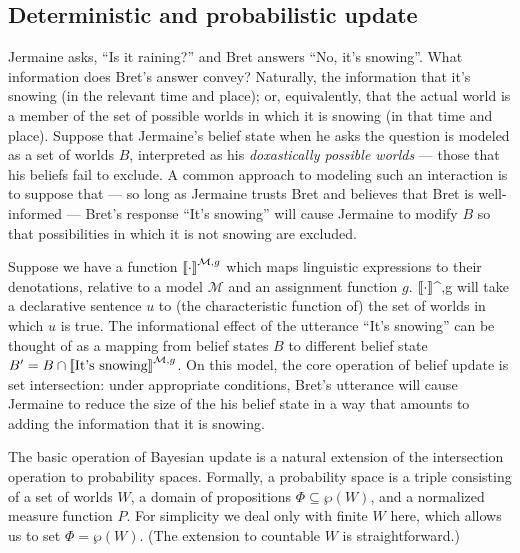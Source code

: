 \documentclass[12pt]{article}
\newcommand{\llbracket}{\ensuremath{\left [\!\left [}}%
\newcommand{\rrbracket}{\ensuremath{\right ]\!\right ]}}
\providecommand{\sv}[1]{\ensuremath{\llbracket #1 \rrbracket}}
\begin{document}
\subsection{Deterministic and probabilistic update}
Jermaine asks, ``Is it raining?'' and Bret answers ``No, it's snowing''. What information does Bret's answer convey? Naturally, the information that it's snowing (in the relevant time and place); or, equivalently, that the actual world is a member of the set of possible worlds in which it is snowing (in that time and place). Suppose that Jermaine's belief state when he asks the question is modeled as a set of worlds $B$, interpreted as his \emph{doxastically possible worlds} --- those that his beliefs fail to exclude. A common approach to modeling such an interaction is to suppose that --- so long as Jermaine trusts Bret and believes that Bret is well-informed --- Bret's response ``It's snowing'' will cause Jermaine to modify $B$ so that possibilities in which it is not snowing are excluded. 

Suppose we have a function $\sv{\cdot}^{\mathcal{M},g}$ which maps linguistic expressions to their denotations, relative to a model $\mathcal{M}$ and an assignment function $g$. \sv{\cdot}^{,g} will take a declarative sentence $u$ to (the characteristic function of) the set of worlds in which $u$ is true. The informational effect of the utterance ``It's snowing'' can be thought of as a mapping from belief states $B$ to different belief state $B' = B \cap \sv{\text{It's snowing}}^{\mathcal{M},g}$. On this model, the core operation of belief update is set intersection: under appropriate conditions, Bret's utterance will cause Jermaine to reduce the size of the his belief state in a way that amounts to adding the information that it is snowing. 

The basic operation of Bayesian update is a natural extension of the intersection operation to probability spaces. Formally, a probability space is a triple consisting of a set of worlds $W$, a domain of propositions $\Phi \subseteq \wp(W)$, and a normalized measure function $P$. For simplicity we deal only with finite $W$ here, which allows us to set $\Phi = \wp(W)$. (The extension to countable $W$ is straightforward.)
\end{document}
